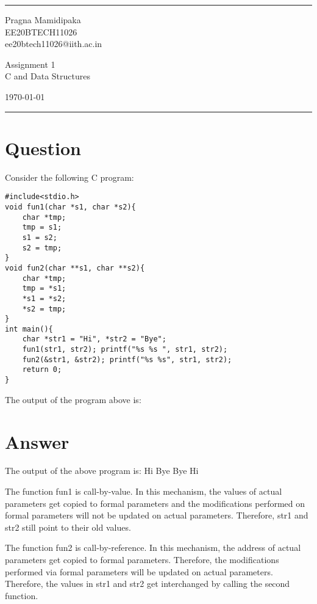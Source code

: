 \documentclass[a4paper]{article}
\begin{document}


\hrule \medskip %
\begin{minipage}{0.295\textwidth} 
\raggedright
\footnotesize
Pragna Mamidipaka \hfill\\   
EE20BTECH11026\hfill\\
ee20btech11026@iith.ac.in
\end{minipage}
\begin{minipage}{0.4\textwidth} 
\centering 
\large 
Assignment 1\\ 
\normalsize 
C and Data Structures\\ 
\end{minipage}
\begin{minipage}{0.295\textwidth} 
\raggedleft
\today\hfill\\
\end{minipage}
\medskip\hrule 
\bigskip


\section*{Question}

Consider the following C program:
\begin{lstlisting}
#include<stdio.h>
void fun1(char *s1, char *s2){
    char *tmp;
    tmp = s1;
    s1 = s2;
    s2 = tmp;
}
void fun2(char **s1, char **s2){
    char *tmp;
    tmp = *s1;
    *s1 = *s2;
    *s2 = tmp;
}
int main(){
    char *str1 = "Hi", *str2 = "Bye";
    fun1(str1, str2); printf("%s %s ", str1, str2);
    fun2(&str1, &str2); printf("%s %s", str1, str2);
    return 0;
}

\end{lstlisting}
The output of the program above is:
\bigbreak
\section*{Answer}
The output of the above program is:
Hi Bye Bye Hi

The function fun1 is call-by-value. In this mechanism, the values of actual parameters get copied to formal parameters and the modifications performed on formal parameters will not be updated on actual parameters.
Therefore, str1 and str2 still point to their old values.

The function fun2 is call-by-reference. In this mechanism, the address of actual parameters get copied to formal parameters. Therefore, the modifications performed via formal parameters will be updated on actual parameters.
Therefore, the values in str1 and str2 get interchanged by calling the second function.
\end{document}
